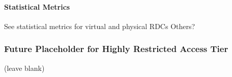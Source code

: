\paragraph{Statistical Metrics}

     See statistical metrics for virtual and physical RDCs
     Others?



\begin{comment}
Licensing agreements require:
\begin{itemize}
\item a demonstrated need for sensitive data;
\item authorization for all users at the requesting institution;
\item signature by a senior level official and key staff;
\item a data security plan;
\item agreement by researchers not to identify individual research subjects or to link data received with other microdata files; and
\item typically review of all statistical output before publication, though licensing agreement delegate this to the requesting institution (researchers)
[text from Restricted Access Procedures].
\item 
The license may be for a specified period of time and data files must be returned or destroyed. 
\item Some licensors require fees and/or approval by an institutional review board. 
\end{itemize}


\paragraph{Pros for Licensing Program}
\begin{itemize}
    \item Provides for flexibility in terms of analysis methods and user computing infrastructure
    \item Because no computer infrastructure needs to be set up to support access, relatively low-cost method
\end{itemize}

\paragraph{Cons for Licensing Program}

\begin{itemize}
    \item Loss of control over data security, mitigated by inspections
    \item Potential loss of control over output control
\end{itemize}

\end{comment}


 

\subsubsection{Future Placeholder for Highly Restricted Access Tier}
(leave blank)


